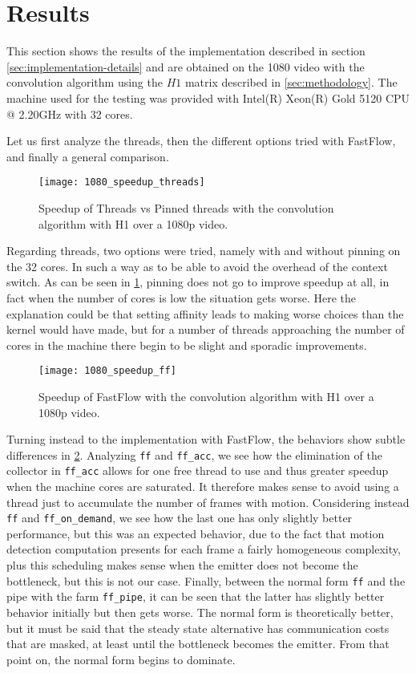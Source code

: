\section{Results}
This section shows the results of the implementation described in section \cref{sec:implementation-details} and are obtained on the 1080 video with the convolution algorithm using the $H1$ matrix described in \cref{sec:methodology}. The machine used for the testing was provided with Intel(R) Xeon(R) Gold 5120 CPU @ 2.20GHz with 32 cores.

Let us first analyze the threads, then the different options tried with FastFlow, and finally a general comparison.

\begin{figure}[!htp]
    \centering
    \texttt{[image: 1080\_speedup\_threads]}
    \caption{Speedup of Threads vs Pinned threads with the convolution algorithm with H1 over a 1080p video.}
    \label{fig:1080-speedup-stream-threads}
\end{figure}
Regarding threads, two options were tried, namely with and without pinning on the 32 cores. In such a way as to be able to avoid the overhead of the context switch. As can be seen in \cref{fig:1080-speedup-stream-threads}, pinning does not go to improve speedup at all, in fact when the number of cores is low the situation gets worse. Here the explanation could be that setting affinity leads to making worse choices than the kernel would have made, but for a number of threads approaching the number of cores in the machine there begin to be slight and sporadic improvements.

\begin{figure}[!htp]
    \centering
    \texttt{[image: 1080\_speedup\_ff]}
    \caption{Speedup of FastFlow with the convolution algorithm with H1 over a 1080p video.}
    \label{fig:1080-speedup-stream-ff}
\end{figure}
Turning instead to the implementation with FastFlow, the behaviors show subtle differences in \cref{fig:1080-speedup-stream-ff}. Analyzing \texttt{ff} and \texttt{ff_acc}, we see how the elimination of the collector in \texttt{ff_acc} allows for one free thread to use and thus greater speedup when the machine cores are saturated. It therefore makes sense to avoid using a thread just to accumulate the number of frames with motion.
Considering instead \texttt{ff} and \texttt{ff_on_demand}, we see how the last one has only slightly better performance, but this was an expected behavior, due to the fact that motion detection computation presents for each frame a fairly homogeneous complexity, plus this scheduling makes sense when the emitter does not become the bottleneck, but this is not our case.
Finally, between the normal form \texttt{ff} and the pipe with the farm \texttt{ff_pipe}, it can be seen that the latter has slightly better behavior initially but then gets worse. The normal form is theoretically better, but it must be said that the steady state alternative has communication costs that are masked, at least until the bottleneck becomes the emitter. From that point on, the normal form begins to dominate.

